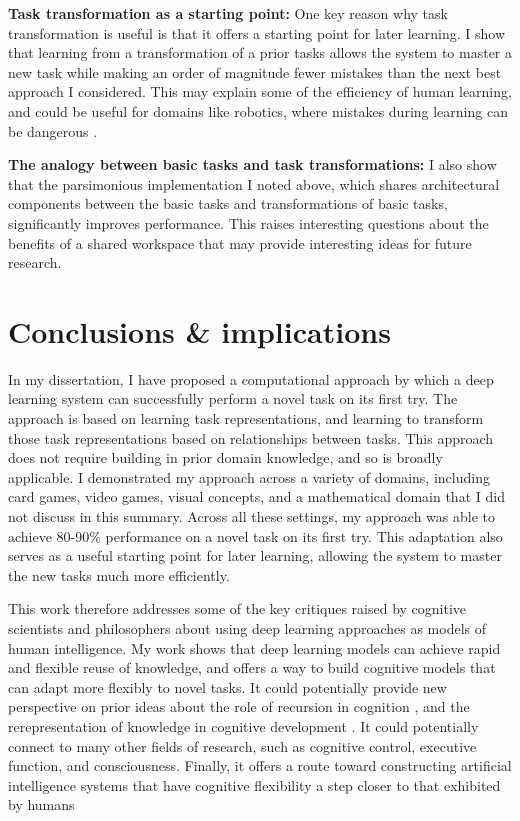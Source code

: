 \documentclass[12pt]{article}
\begin{document}
\textbf{Task transformation as a starting point:} One key reason why task transformation is useful is that it offers a starting point for later learning. I show that learning from a transformation of a prior tasks allows the system to master a new task while making an order of magnitude fewer mistakes than the next best approach I considered. This may explain some of the efficiency of human learning, and could be useful for domains like robotics, where mistakes during learning can be dangerous \citep{Turchetta2016}.  

\textbf{The analogy between basic tasks and task transformations:} I also show that the parsimonious implementation I noted above, which shares architectural components between the basic tasks and transformations of basic tasks, significantly improves performance. This raises interesting questions about the benefits of a shared workspace that may provide interesting ideas for future research.

\section{Conclusions \& implications}

In my dissertation, I have proposed a computational approach by which a deep learning system can successfully perform a novel task on its first try. The approach is based on learning task representations, and learning to transform those task representations based on relationships between tasks. This approach does not require building in prior domain knowledge, and so is broadly applicable. I demonstrated my approach across a variety of domains, including card games, video games, visual concepts, and a mathematical domain that I did not discuss in this summary. Across all these settings, my approach was able to achieve 80-90\% performance on a novel task on its first try. This adaptation also serves as a useful starting point for later learning, allowing the system to master the new tasks much more efficiently. 

This work therefore addresses some of the key critiques raised by cognitive scientists and philosophers about using deep learning approaches as models of human intelligence. My work shows that deep learning models can achieve rapid and flexible reuse of knowledge, and offers a way to build cognitive models that can adapt more flexibly to novel tasks. It could potentially provide new perspective on prior ideas about the role of recursion in cognition \citep{Fodor2008lot2}, and the rerepresentation of knowledge in cognitive development \citep{Karmiloff-Smith1986}. It could potentially connect to many other fields of research, such as cognitive control, executive function, and consciousness. Finally, it offers a route toward constructing artificial intelligence systems that have cognitive flexibility a step closer to that exhibited by humans 
\end{document}

